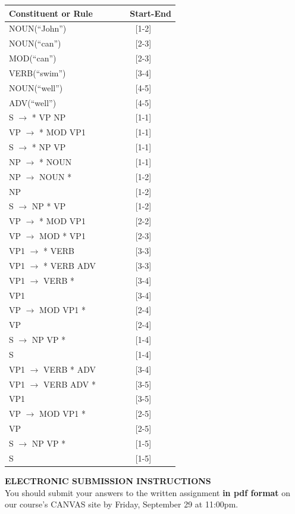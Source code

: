 \documentclass[11pt]{article}
\begin{document}
\begin{enumerate}
\begin{center}
\begin{tabular}{lc} 
{\bf Constituent or Rule~~~} & {\bf ~~~Start-End} \\ \hline
NOUN(``John'') &  [1-2] \\
NOUN(``can'') & [2-3] \\
MOD(``can'') & [2-3] \\
VERB(``swim'') & [3-4] \\
NOUN(``well'') & [4-5] \\
ADV(``well'') & [4-5] \\
S $\rightarrow$ * VP NP & [1-1]\\
VP $\rightarrow$ * MOD VP1 & [1-1]\\
S $\rightarrow$ * NP VP & [1-1]\\
NP $\rightarrow$ * NOUN & [1-1]\\
NP $\rightarrow$ NOUN * & [1-2]\\
NP & [1-2]\\
S $\rightarrow$ NP * VP & [1-2] \\
VP $\rightarrow$ * MOD VP1 & [2-2] \\
VP $\rightarrow$ MOD * VP1 & [2-3] \\
VP1 $\rightarrow$ * VERB & [3-3] \\
VP1 $\rightarrow$ * VERB ADV & [3-3] \\
VP1 $\rightarrow$ VERB * & [3-4] \\
VP1 & [3-4]\\
VP $\rightarrow$ MOD VP1 * & [2-4] \\
VP & [2-4] \\
S $\rightarrow$ NP VP * & [1-4] \\
S & [1-4] \\
VP1 $\rightarrow$ VERB * ADV & [3-4] \\
VP1 $\rightarrow$ VERB ADV * & [3-5] \\
VP1 & [3-5] \\
VP $\rightarrow$ MOD VP1 * & [2-5] \\
VP & [2-5] \\
S $\rightarrow$ NP VP * & [1-5] \\
S & [1-5] \\
\end{tabular}
\end{center}



\end{enumerate}  %




\newpage
\hspace*{1.5in}  {\bf ELECTRONIC SUBMISSION INSTRUCTIONS} \\

You should submit your answers to the written assignment {\bf in pdf format}
on our course's CANVAS site by Friday, September 29 at 11:00pm.
\end{document}
